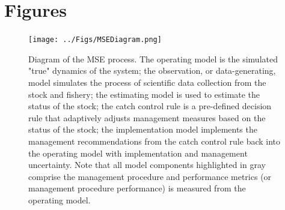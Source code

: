 \documentclass[12pt,english]{article}
\begin{document}
%


\newpage
\section*{Figures}

\begin{figure}[!ht]
\begin{center}
\texttt{[image: ../Figs/MSEDiagram.png]}
\end{center}
\begin{flushleft}
\caption{Diagram of the MSE process. The operating model is the simulated "true" dynamics of the system; the observation, or data-generating, model simulates the process of scientific data collection from the stock and fishery; the estimating model is used to estimate the status of the stock; the catch control rule is a pre-defined decision rule that adaptively adjusts management measures based on the status of the stock; the implementation model implements the management recommendations from the catch control rule back into the operating model with implementation and management uncertainty. Note that all model components highlighted in gray comprise the management procedure and performance metrics (or management procedure performance) is measured from the operating model.}
\label{fig:diagram}
\end{flushleft}
\end{figure}
\end{document}
